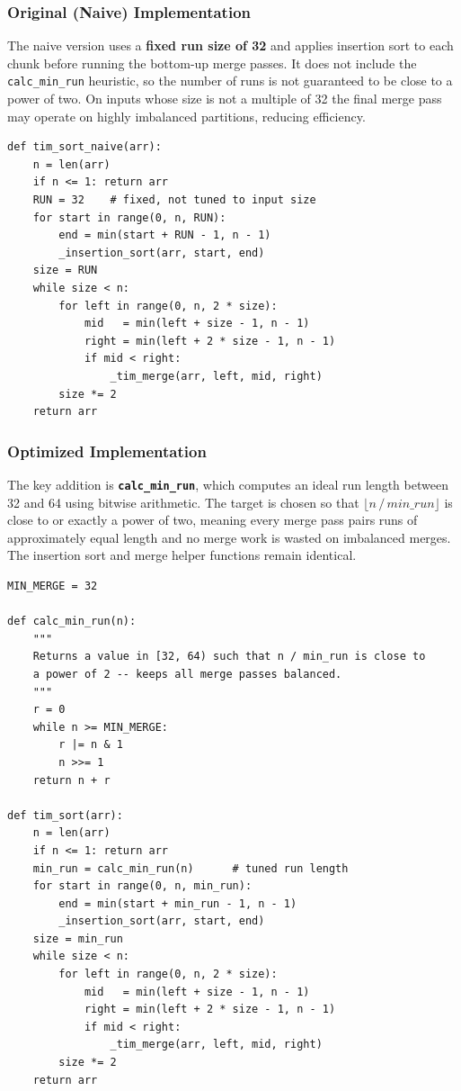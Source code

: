 \documentclass[12pt,a4paper]{article}
\begin{document}
	\subsubsection{Original (Naive) Implementation}
	
	The naive version uses a \textbf{fixed run size of 32} and applies insertion
	sort to each chunk before running the bottom-up merge passes. It does not
	include the \texttt{calc\_min\_run} heuristic, so the number of runs is not
	guaranteed to be close to a power of two. On inputs whose size is not a
	multiple of 32 the final merge pass may operate on highly imbalanced partitions,
	reducing efficiency.
	
	\begin{lstlisting}[caption={Timsort (naive original) -- fixed run size, no balancing.}]
def tim_sort_naive(arr):
	n = len(arr)
	if n <= 1: return arr
	RUN = 32    # fixed, not tuned to input size
	for start in range(0, n, RUN):
		end = min(start + RUN - 1, n - 1)
		_insertion_sort(arr, start, end)
	size = RUN
	while size < n:
		for left in range(0, n, 2 * size):
			mid   = min(left + size - 1, n - 1)
			right = min(left + 2 * size - 1, n - 1)
			if mid < right:
				_tim_merge(arr, left, mid, right)
		size *= 2
	return arr
	\end{lstlisting}
	
	\subsubsection{Optimized Implementation}
	
	The key addition is \textbf{\texttt{calc\_min\_run}}, which computes an ideal
	run length between 32 and 64 using bitwise arithmetic. The target is chosen so
	that $\lfloor n\,/\,\mathit{min\_run} \rfloor$ is close to or exactly a power
	of two, meaning every merge pass pairs runs of approximately equal length and
	no merge work is wasted on imbalanced merges. The insertion sort and merge
	helper functions remain identical.
	
	\begin{lstlisting}[caption={Timsort (optimized) -- \texttt{calc\_min\_run} balancing heuristic.}]
MIN_MERGE = 32
		
def calc_min_run(n):
	"""
	Returns a value in [32, 64) such that n / min_run is close to
	a power of 2 -- keeps all merge passes balanced.
	"""
	r = 0
	while n >= MIN_MERGE:
		r |= n & 1
		n >>= 1
	return n + r
		
def tim_sort(arr):
	n = len(arr)
	if n <= 1: return arr
	min_run = calc_min_run(n)      # tuned run length
	for start in range(0, n, min_run):
		end = min(start + min_run - 1, n - 1)
		_insertion_sort(arr, start, end)
	size = min_run
	while size < n:
		for left in range(0, n, 2 * size):
			mid   = min(left + size - 1, n - 1)
			right = min(left + 2 * size - 1, n - 1)
			if mid < right:
				_tim_merge(arr, left, mid, right)
		size *= 2
	return arr
	\end{lstlisting}
	
\end{document}
